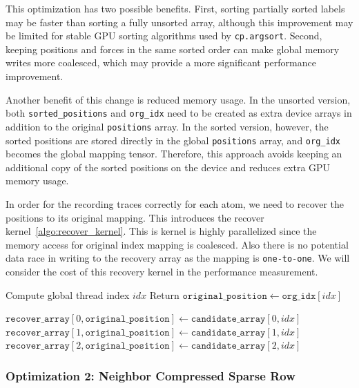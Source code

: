 \documentclass[12pt]{article}
\begin{document}
This optimization has two possible benefits. First, sorting partially sorted labels may be faster than sorting a fully unsorted array, although this improvement may be limited for stable GPU sorting algorithms used by \texttt{cp.argsort}\cite{cupy_argsort}. Second, keeping positions and forces in the same sorted order can make global memory writes more coalesced, which may provide a more significant performance improvement.

Another benefit of this change is reduced memory usage. In the unsorted version, both \texttt{sorted\_positions} and \texttt{org\_idx} need to be created as extra device arrays in addition to the original \texttt{positions} array. In the sorted version, however, the sorted positions are stored directly in the global \texttt{positions} array, and \texttt{org\_idx} becomes the global mapping tensor. Therefore, this approach avoids keeping an additional copy of the sorted positions on the device and reduces extra GPU memory usage.

In order for the recording traces correctly for each atom, we need to recover the positions to its original mapping. This introduces the recover kernel~\ref{algo:recover_kernel}. This is kernel is highly parallelized since the memory access for original index mapping is coalesced. Also there is no potential data race in writing to the recovery array as the mapping is \texttt{one-to-one}. We will consider the cost of this recovery kernel in the performance measurement.

\begin{algorithm}
\caption{Recover Array to Original Order}\label{algo:recover_kernel}
\begin{algorithmic}[1]

\State Compute global thread index $idx$
    \State Return
\EndIf
\State $\texttt{original\_position} \gets \texttt{org\_idx}[idx]$

\State 
\State $\texttt{recover\_array}[0,\texttt{original\_position}] \gets \texttt{candidate\_array}[0,idx]$
\State $\texttt{recover\_array}[1,\texttt{original\_position}] \gets \texttt{candidate\_array}[1,idx]$
\State $\texttt{recover\_array}[2,\texttt{original\_position}] \gets \texttt{candidate\_array}[2,idx]$

\end{algorithmic}
\end{algorithm}

\subsubsection{Optimization 2: Neighbor Compressed Sparse Row}
\end{document}
